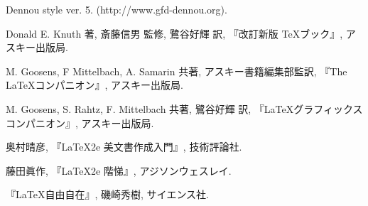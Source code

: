 %
%


\begin{thebibliography}{99}
		Dennou style ver. 5. (http://www.gfd-dennou.org).

		Donald E. Knuth 著, 斎藤信男 監修, 鷺谷好輝 訳,
		『改訂新版 \TeX ブック』, アスキー出版局.

		M. Goosens, F Mittelbach, A. Samarin 共著, アスキー書籍編集部監訳,
		『The \LaTeX コンパニオン』, アスキー出版局.

		 M. Goosens, S. Rahtz, F. Mittelbach 共著, 鷺谷好輝 訳,
		『\LaTeX グラフィックスコンパニオン』, アスキー出版局.

		 奥村晴彦, 『\LaTeX2e 美文書作成入門』, 技術評論社.

		藤田眞作, 『\LaTeX2e 階悌』, アジソンウェスレイ.

		 『\LaTeX 自由自在』, 磯崎秀樹, サイエンス社.

	
\end{thebibliography}
